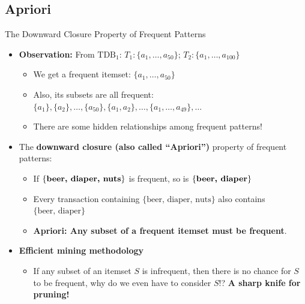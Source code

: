 \documentclass[aspectratio=169, 11pt]{beamer}
\begin{document}
\subsection{Apriori}

\begin{frame}{The Downward Closure Property of Frequent Patterns}
    \begin{itemize}
        \item \textbf{Observation:} From $\text{TDB}_1$: $T_1: \{a_1, \dots, a_{50}\}$; \quad $T_2: \{a_1, \dots, a_{100}\}$
        \begin{itemize}
            \item We get a frequent itemset: $\{a_1, \dots, a_{50}\}$
            \item Also, its subsets are all frequent: $\{a_1\}, \{a_2\}, \dots, \{a_{50}\}, \{a_1, a_2\}, \dots, \{a_1, \dots, a_{49}\}, \dots$
            \item There are some hidden relationships among frequent patterns!
        \end{itemize}
        \item The \textbf{downward closure (also called ``Apriori'')} property of frequent patterns:
        \begin{itemize}
            \item If $\{\text{\textbf{beer, diaper, nuts}}\}$ is frequent, so is $\{\text{\textbf{beer, diaper}}\}$
            \item Every transaction containing $\{\text{beer, diaper, nuts}\}$ also contains $\{\text{beer, diaper}\}$
            \item \textbf{Apriori: Any subset of a frequent itemset must be frequent}.
        \end{itemize}
        \item \textbf{Efficient mining methodology}
        \begin{itemize}
            \item If any subset of an itemset $S$ is infrequent, then there is no chance for $S$ to be frequent, why do we even have to consider $S$!? \textbf{A sharp knife for pruning!}
        \end{itemize}
    \end{itemize}
\end{frame}
\end{document}
